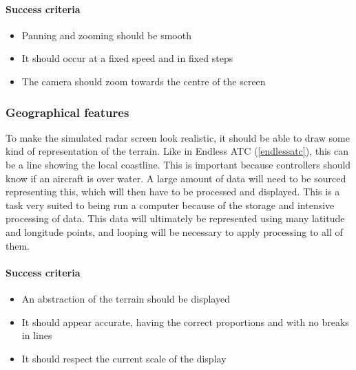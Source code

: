 \documentclass{article}
\begin{document}
\paragraph{Success criteria}
\begin{itemize}
    \item Panning and zooming should be smooth
    \item It should occur at a fixed speed and in fixed steps
    \item The camera should zoom towards the centre of the screen
\end{itemize}

\subsubsection{Geographical features}
To make the simulated radar screen look realistic, it should be able to draw some kind of representation of the terrain.
Like in Endless ATC (\ref{endlessatc}), this can be a line showing the local coastline.
This is important because controllers should know if an aircraft is over water.
A large amount of data will need to be sourced representing this, which will then have to be processed and displayed.
This is a task very suited to being run a computer because of the storage and intensive processing of data.
This data will ultimately be represented using many latitude and longitude points, and looping will be necessary to apply processing to all of them.

\paragraph{Success criteria}
\begin{itemize}
    \item An abstraction of the terrain should be displayed
    \item It should appear accurate, having the correct proportions and with no breaks in lines
    \item It should respect the current scale of the display
\end{itemize}
\end{document}
